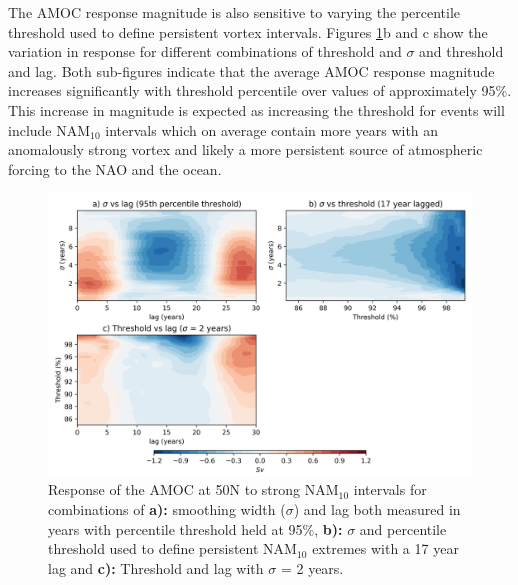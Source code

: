 The AMOC response magnitude is also sensitive to varying the percentile threshold used to define persistent vortex intervals. Figures \ref{sensitivity}b and c show the variation in response for different combinations of threshold and $\sigma$ and threshold and lag. Both sub-figures indicate that the average AMOC response magnitude increases significantly with threshold percentile over values of approximately 95\%. This increase in magnitude is expected as increasing the threshold for events will include NAM$_{10}$ intervals which on average contain more years with an anomalously strong vortex and likely a more persistent source of atmospheric forcing to the NAO and the ocean. 

\begin{figure}[h!]
\begin{center}
\noindent\includegraphics[width =\linewidth]{Figures/Figures-surface/sensitivity_contours_strong.png} 
\caption{Response of the AMOC at 50N to strong NAM$_{10}$ intervals for combinations of \textbf{a):} smoothing width ($\sigma$) and lag both measured in years with percentile threshold held at 95\%, \textbf{b):} $\sigma$ and percentile threshold used to define persistent NAM$_{10}$ extremes with a 17 year lag and \textbf{c):} Threshold and lag with $\sigma$ = 2 years.}
\label{sensitivity}
\end{center}
\end{figure}

